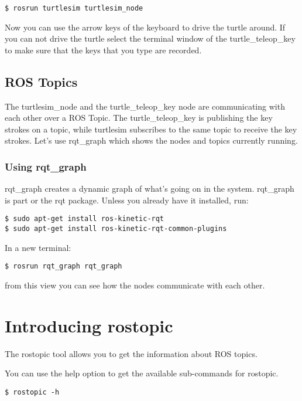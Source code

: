 \begin{lstlisting}[breaklines=true languages=bash]
$ rosrun turtlesim turtlesim_node
\end{lstlisting}

Now you can use the arrow keys of the keyboard to drive the turtle around. If you can not drive the turtle select the terminal window of the turtle\_teleop\_key to make sure that the keys that you type are recorded.

\subsection{ROS Topics}
The turtlesim\_node and the turtle\_teleop\_key node are communicating with each other over a ROS Topic. The turtle\_teleop\_key is publishing the key strokes on a topic, while turtlesim subscribes to the same topic to receive the key strokes. Let's use rqt\_graph which shows the nodes and topics currently running.

\subsubsection{Using rqt\_graph}
rqt\_graph creates a dynamic graph of what's going on in the system. rqt\_graph is part or the rqt package. Unless you already have it installed, run:
\begin{lstlisting}[breaklines=true languages=bash]
$ sudo apt-get install ros-kinetic-rqt
$ sudo apt-get install ros-kinetic-rqt-common-plugins
\end{lstlisting}

In a new terminal:

\begin{lstlisting}[breaklines=true languages=bash]
$ rosrun rqt_graph rqt_graph
\end{lstlisting}

from this view you can see how the nodes communicate with each other.

\section{Introducing rostopic}
The rostopic tool allows you to get the information about ROS topics.

You can use the help option to get the available sub-commands for rostopic.
\begin{lstlisting}[breaklines=true languages=bash]
$ rostopic -h
\end{lstlisting}

